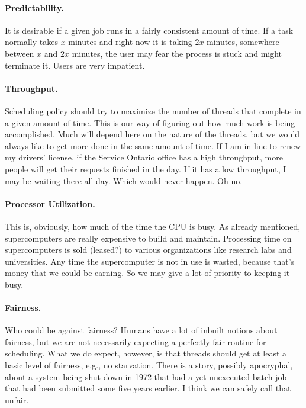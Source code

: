 \paragraph{Predictability.} It is desirable if a given job runs in a fairly consistent amount of time. If a task normally takes $x$ minutes and right now it is taking $2x$ minutes, somewhere between $x$ and $2x$ minutes, the user may fear the process is stuck and might terminate it. Users are very impatient.

\paragraph{Throughput.} Scheduling policy should try to maximize the number of threads that complete in a given amount of time. This is our way of figuring out how much work is being accomplished. Much will depend here on the nature of the threads, but we would always like to get more done in the same amount of time. If I am in line to renew my drivers' license, if the Service Ontario office has a high throughput, more people will get their requests finished in the day. If it has a low throughput, I may be waiting there all day. Which would never happen. Oh no.

\paragraph{Processor Utilization.} This is, obviously, how much of the time the CPU is busy. As already mentioned, supercomputers are really expensive to build and maintain. Processing time on supercomputers is sold (leased?) to various organizations like research labs and universities. Any time the supercomputer is not in use is wasted, because that's money that we could be earning. So we may give a lot of priority to keeping it busy.

\paragraph{Fairness.} Who could be against fairness? Humans have a lot of inbuilt notions about fairness, but we are not necessarily expecting a perfectly fair routine for scheduling. What we do expect, however, is that threads should get at least a basic level of fairness, e.g., no starvation. There is a story, possibly apocryphal, about a system being shut down in 1972 that had a yet-unexecuted batch job that had been submitted some five years earlier. I think we can safely call that unfair.

